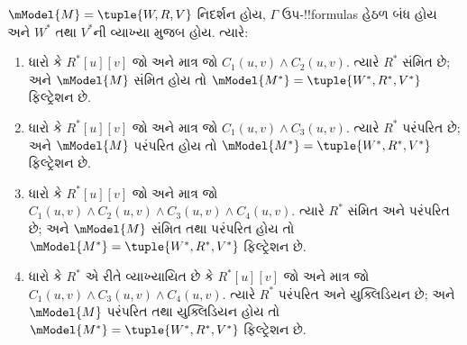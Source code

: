 \documentclass[../../../include/open-logic-section]{subfiles}
\begin{document}
\begin{thm}
  $\mModel{M} =\tuple{W,R,V}$ નિદર્શન હોય, $\Gamma$ ઉપ-!!{formula}s
  હેઠળ બંધ હોય અને $W^*$ તથા $V^*$ની વ્યાખ્યા
   મુજબ હોય. ત્યારે:
  \begin{enumerate}
  \item ધારો કે $R^*[u][v]$ જો અને માત્ર જો $C_1(u, v) \land
    C_2(u,v)$. ત્યારે $R^*$ સંમિત છે; અને $\mModel{M}$ સંમિત હોય
    તો $\mModel{M^*} = \tuple{W^*,R^*,V^*}$ ફિલ્ટ્રેશન છે.
  \item ધારો કે $R^*[u][v]$ જો અને માત્ર જો $C_1(u, v)
    \land C_3(u,v)$. ત્યારે $R^*$ પરંપરિત છે; અને
    $\mModel{M}$ પરંપરિત હોય તો
    $\mModel{M^*}=\tuple{W^*,R^*,V^*}$ ફિલ્ટ્રેશન છે.
  \item ધારો કે $R^*[u][v]$ જો અને માત્ર જો $C_1(u, v) \land C_2(u,v)
    \land C_3(u,v) \land C_4(u,v)$. ત્યારે $R^*$ સંમિત અને
    પરંપરિત છે; અને $\mModel{M}$ સંમિત તથા પરંપરિત હોય તો
    $\mModel{M^*}=\tuple{W^*,R^*,V^*}$ ફિલ્ટ્રેશન છે.
  \item ધારો કે $R^*$ એ રીતે વ્યાખ્યાયિત છે કે $R^*[u][v]$ જો
    અને માત્ર જો $C_1(u,
    v) \land C_3(u,v) \land C_4(u,v)$. ત્યારે $R^*$ પરંપરિત
    અને યુક્લિડિયન છે; અને $\mModel{M}$ પરંપરિત તથા યુક્લિડિયન
    હોય તો $\mModel{M^*}=\tuple{W^*,R^*,V^*}$ ફિલ્ટ્રેશન છે.
  \end{enumerate}
\end{thm}
\end{document}
